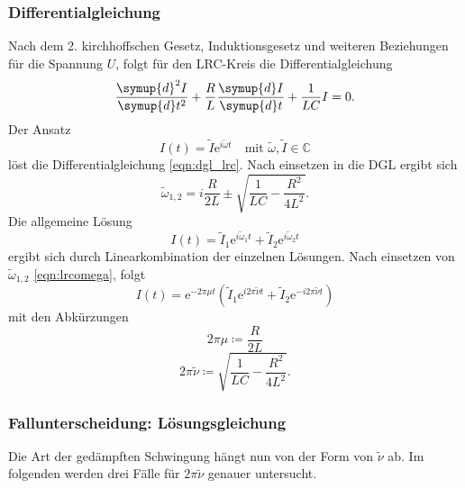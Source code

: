 \subsubsection{Differentialgleichung}
Nach dem 2. kirchhoffschen Gesetz, Induktionsgesetz und weiteren Beziehungen für die Spannung $U$, folgt für den LRC-Kreis die Differentialgleichung
\begin{equation}
    \frac{\symup{d}^2I}{\symup{d}t^2} + \frac{R}{L} \frac{\symup{d}I}{\symup{d}t} + \frac{1}{LC} I = 0 .
    \label{eqn:dgl_lrc}
\end{equation}
Der Ansatz
\begin{equation*}
    I(t) = \tilde{I} \mathrm{e}^{i\tilde{\omega} t} \quad \text{mit } \tilde{\omega}, \tilde{I} \in \mathbb{C}
\end{equation*}
löst die Differentialgleichung \autoref{eqn:dgl_lrc}.
Nach einsetzen in die DGL ergibt sich
\begin{equation}
    \tilde{\omega}_{1,2} = i \frac{R}{2L} \pm \sqrt{\frac{1}{LC} - \frac{R^2}{4L^2}} .
    \label{eqn:lrcomega}
\end{equation}
Die allgemeine Lösung
\begin{equation*}
    I(t) = \tilde{I}_1 \mathrm{e}^{i\tilde{\omega}_1 t} + \tilde{I}_2 \mathrm{e}^{i\tilde{\omega}_2 t}
\end{equation*}
ergibt sich durch Linearkombination der einzelnen Lösungen.
Nach einsetzen von $\tilde{\omega}_{1,2}$ \autoref{eqn:lrcomega}, folgt
\begin{equation}
    I(t) = \mathrm{e}^{-2 \pi \mu t} \left ( \tilde{I}_1 \mathrm{e}^{i 2\pi \tilde{\nu} t} + \tilde{I}_2 \mathrm{e}^{-i 2\pi \tilde{\nu} t} \right)
    \label{eqn:dgl_loesung}
\end{equation}
mit den Abkürzungen
\begin{equation*}
    2\pi\mu \coloneqq \frac{R}{2L}
\end{equation*}
\begin{equation*}
    2\pi\tilde{\nu} \coloneqq \sqrt{\frac{1}{LC} - \frac{R^2}{4L^2}} .
\end{equation*}

\subsubsection{Fallunterscheidung: Lösungsgleichung}
Die Art der gedämpften Schwingung hängt nun von der Form von $\tilde{\nu}$ ab.
Im folgenden werden drei Fälle für $2\pi\tilde{\nu}$ genauer untersucht.\\
\\

